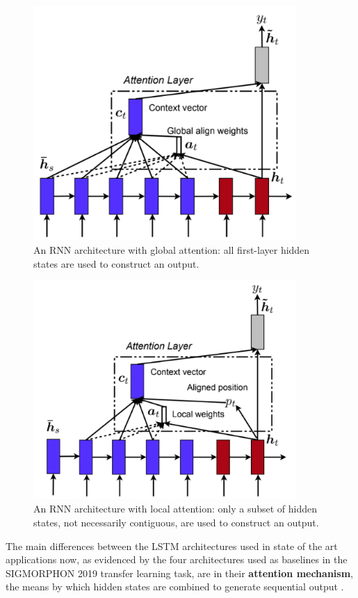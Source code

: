 \begin{figure}[ht]
\includegraphics[width=10cm]{images/global.png}
\centering
\caption{An RNN architecture with global attention: all first-layer hidden states are used to construct an output. \parencite{Luong2015}}
\end{figure}

\begin{figure}[ht]
\includegraphics[width=10cm]{images/local.png}
\centering
\caption{An RNN architecture with local attention: only a subset of hidden states, not necessarily contiguous, are used to construct an output. \parencite{Luong2015}}
\end{figure}

The main differences between the LSTM architectures used in state of the art applications now, as evidenced by the four architectures used as baselines in the SIGMORPHON 2019 transfer learning task, are in their \textbf{attention mechanism}, the means by which hidden states are combined to generate sequential output \parencite{Cotterell2019}. 

